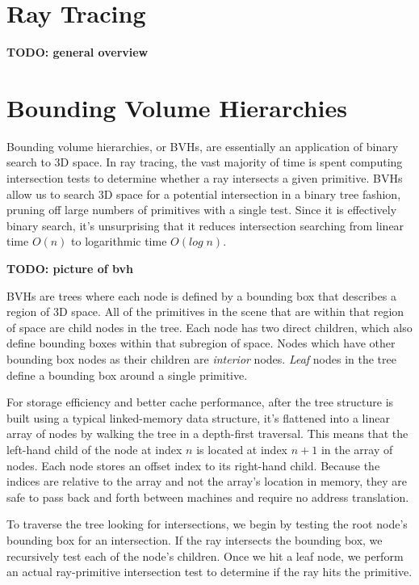 \documentclass[12pt]{ucthesis}
\begin{document}
\section{Ray Tracing}
\label{raytracing}

\textbf{TODO: general overview}

\section{Bounding Volume Hierarchies}
\label{bvhs}

Bounding volume hierarchies, or BVHs, are essentially an application of binary
search to 3D space. In ray tracing, the vast majority of time is spent
computing intersection tests to determine whether a ray intersects a given
primitive. BVHs allow us to search 3D space for a potential intersection in a
binary tree fashion, pruning off large numbers of primitives with a single
test. Since it is effectively binary search, it's unsurprising that it reduces
intersection searching from linear time $O(n)$ to logarithmic time $O(log\;n)$.

\textbf{TODO: picture of bvh}

BVHs are trees where each node is defined by a bounding box that describes
a region of 3D space. All of the primitives in the scene that are within that
region of space are child nodes in the tree. Each node has two direct children,
which also define bounding boxes within that subregion of space. Nodes which
have other bounding box nodes as their children are \emph{interior} nodes.
\emph{Leaf} nodes in the tree define a bounding box around a single primitive.

For storage efficiency and better cache performance, after the tree structure
is built using a typical linked-memory data structure, it's flattened into a
linear array of nodes by walking the tree in a depth-first traversal. This means
that the left-hand child of the node at index $n$ is located at index $n + 1$
in the array of nodes. Each node stores an offset index to its right-hand child.
Because the indices are relative to the array and not the array's location in
memory, they are safe to pass back and forth between machines and require no
address translation.

To traverse the tree looking for intersections, we begin by testing the root
node's bounding box for an intersection. If the ray intersects the bounding
box, we recursively test each of the node's children. Once we hit a leaf node,
we perform an actual ray-primitive intersection test to determine if the ray
hits the primitive.
\end{document}

